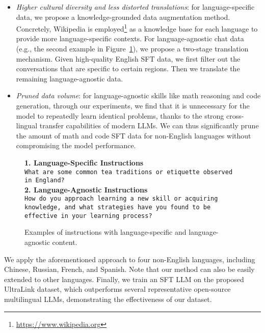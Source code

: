 \documentclass[11pt]{article}
\begin{document}
\begin{itemize}
    \item {\em Higher cultural diversity and less distorted translations}: for language-specific data, we propose a knowledge-grounded data augmentation method. Concretely, Wikipedia is employed\footnote{\url{https://www.wikipedia.org}} as a knowledge base for each language to provide more language-specific contexts.
    For language-agnostic chat data (e.g., the second example in Figure~\ref{fig:lang-example}), we propose a two-stage translation mechanism. Given high-quality English SFT data, we first filter out the conversations that are specific to certain regions. Then we translate the remaining language-agnostic data.
    \item {\em Pruned data volume}: for language-agnostic skills like math reasoning and code generation, through our experiments, we find that it is unnecessary for the model to repeatedly learn identical problems, thanks to the strong cross-lingual transfer capabilities of modern LLMs. We can thus significantly prune the amount of math and code SFT data for non-English languages without compromising the model performance.
\end{itemize}

\begin{figure}[t]
\begin{tcolorbox}[colback=blue!2,colframe=blue!50!black]
\small
\textbf{1. Language-Specific Instructions}\\
\texttt{What are some common tea traditions or etiquette observed in England?}\\
\textbf{2. Language-Agnostic Instructions}\\
\texttt{How do you approach learning a new skill or acquiring knowledge, and what strategies have you found to be effective in your learning process?}
\end{tcolorbox}
\caption{Examples of instructions with language-specific and language-agnostic content.}
\label{fig:lang-example}
\end{figure}

We apply the aforementioned approach to four non-English languages, including Chinese, Russian, French, and Spanish. Note that our method can also be easily extended to other languages. Finally, we train an SFT LLM on the proposed UltraLink dataset, which outperforms several representative open-source multilingual LLMs, demonstrating the effectiveness of our dataset.
\end{document}
